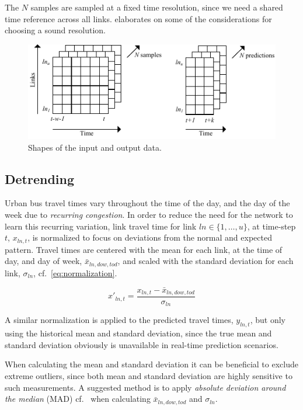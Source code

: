 ﻿\documentclass[preprint,11pt,5p,twocolumn]{elsarticle}
\begin{document}
The $N$ samples are sampled at a fixed time resolution, since we need a shared time reference across all links.  elaborates on some of the considerations for choosing a sound resolution.

\begin{figure}[!ht]
  \centering
  \includegraphics[scale=1.0]{drawings/data_shape.pdf}
  \caption{Shapes of the input and output data.}
  \label{fig:data_shape}
\end{figure}

\subsection{Detrending}
Urban bus travel times vary throughout the time of the day, and the day of the week due to \emph{recurring congestion}. In order to reduce the need for the network to learn this recurring variation, link travel time for link $\mathit{ln} \in \{ 1,\ldots,u\}$, at time-step $t$, $x_{\mathit{ln},t}$, is normalized to focus on deviations from the normal and expected pattern. Travel times are centered with the mean for each link, at the time of day, and day of week, $\mathit{\bar{x}_{\mathit{ln},\mathit{dow},\mathit{tod}}}$, and scaled with the standard deviation for each link, $\sigma_\mathit{ln}$, cf.~\cref{eq:normalization}.

\begin{equation}
  x'_{\mathit{ln},t} = \frac{x_{\mathit{ln},t} - \bar{x}_{\mathit{ln},\mathit{dow},\mathit{tod}}}{\sigma_\mathit{ln}}
  \label{eq:normalization}
\end{equation}

A similar normalization is applied to the predicted travel times, $y_{\mathit{ln},t}$, but only using the historical mean and standard deviation, since the true mean and standard deviation obviously is unavailable in real-time prediction scenarios.

When calculating the mean and standard deviation it can be beneficial to exclude extreme outliers, since both mean and standard deviation are highly sensitive to such measurements. A suggested method is to apply \emph{absolute deviation around the median} (MAD) cf.~\cite{Olewuezi2011} when calculating $\mathit{\bar{x}_{\mathit{ln},\mathit{dow},\mathit{tod}}}$ and $\sigma_\mathit{ln}$.
\end{document}
